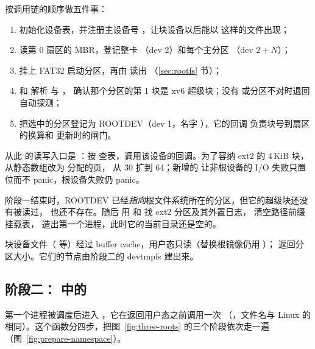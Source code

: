  按调用链的顺序做五件事：

\begin{enumerate}
  \item {} 初始化设备表，并注册主设备号 ，让块设备以后能以  这样的文件出现；
  \item 读第 0 扇区的 MBR，登记整卡 （dev 2）和每个主分区 （dev $2+N$）；
  \item 挂上 FAT32 启动分区，再由  读出 （\ref{sec:rootfs} 节）；
  \item {} 和  解析  与 ， 确认那个分区的第 1 块是 xv6 超级块；没有  或分区不对时退回自动探测；
  \item {} 把选中的分区登记为 ROOTDEV（dev 1，名字 ），它的回调  负责块号到扇区的换算和  更新时的闸门。
\end{enumerate}

从此  的读写入口是 ：按  查表，调用该设备的回调。为了容纳 ext2 的 4\,KiB 块， 从静态数组改为  分配的页， 从 30 扩到 64；新增的  让非根设备的 I/O 失败只置位而不 panic，根设备失败仍 panic。

阶段一结束时，ROOTDEV 已经\emph{指向}根文件系统所在的分区，但它的超级块还没有被读过，\code{/} 也还不存在。随后  用  和  找 ext2 分区及其外置日志， 清空路径前缀挂载表， 造出第一个进程，此时它的当前目录还是空的。

\begin{note}
  块设备文件（ 等）经过 buffer cache，用户态只读（替换根镜像仍用 ）； 返回分区大小。它们的节点由阶段二的 devtmpfs 建出来。
\end{note}

\subsection{阶段二： 中的 }
\label{sec:ns-stage2}

第一个进程被调度后进入 ，它在返回用户态之前调用一次 （，文件名与 Linux 的  相同）。这个函数分四步，把图~\ref{fig:three-roots} 的三个阶段依次走一遍（图~\ref{fig:prepare-namespace}）。

